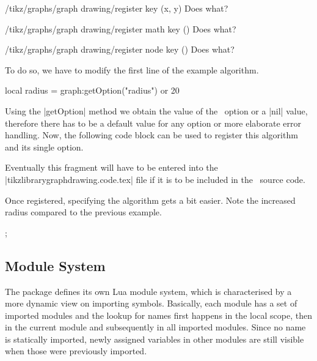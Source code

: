 \begin{key}{/tikz/graphs/graph drawing/register key (x, y)}
  Does what?
\end{key}

\begin{stylekey}{/tikz/graphs/graph drawing/register math key ()}
  Does what?
\end{stylekey}

\begin{stylekey}{/tikz/graphs/graph drawing/register node key ()}
  Does what?
\end{stylekey}

To do so, we have to modify the first line of the example algorithm.

\begin{codeexample}
   local radius = graph:getOption("radius") or 20
\end{codeexample}

Using the |getOption| method we obtain the value of the
\tikzname\ option or a |nil| value, therefore there has to be a
default value for any option or more elaborate error handling.  Now,
the following code block can be used to register this algorithm and
its single option.

\begin{codeexample}
\end{codeexample}


Eventually this fragment will have to be entered into the
|tikzlibrarygraphdrawing.code.tex| file if it is to be included in the
\pgfname\ source code.

Once registered, specifying the algorithm gets a bit easier. Note the
increased radius compared to the previous example.

\begin{codeexample}[]
\tikzpicture [graph drawing={simpleexample, radius = 30}]
  ;
\endtikzpicture
\end{codeexample}

\subsection{Module System}
The package defines its own Lua module system, which is characterised by a
more dynamic view on importing symbols.  Basically, each module has a
set of imported modules and the lookup for names first happens in the local
scope, then in the current module and subsequently in all imported
modules.  Since no name is statically imported, newly assigned
variables in other modules are still visible when those were
previously imported.

